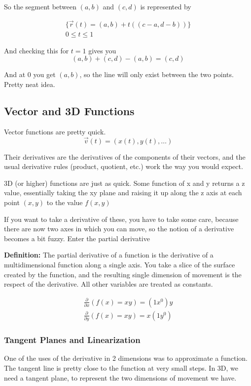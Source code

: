 \documentclass[12pt, letterpaper]{article}
\begin{document}
So the segment between $(a, b)$ and $(c, d)$ is represented by

\begin{gather*}
    \{\vec{r}(t) = (a,b) + t\left((c - a, d - b)\right)\}\\
    0 \leq t \leq 1
\end{gather*}

And checking this for $t = 1$ gives you 
\begin{displaymath}
    (a, b) + (c, d) - (a, b) = (c, d)
\end{displaymath}

And at 0 you get $(a, b)$, so the line will only exist between the two points. Pretty neat idea.

\subsection{Vector and 3D Functions}

Vector functions are pretty quick.
\begin{displaymath}
    \vec{v}(t) = (x(t), y(t), \dots)
\end{displaymath}

Their derivatives are the derivatives of the components of their vectors, and the usual derivative rules (product, quotient, etc.) work the way you would expect.

3D (or higher) functions are just as quick. Some function of x and y returns a z value, essentially taking the xy plane and raising it up along the z axis at each point $(x, y)$ to the value $f(x, y)$

If you want to take a derivative of these, you have to take some care, because there are now two axes in which you can move, so the notion of a derivative becomes a bit fuzzy. Enter the partial derivative

\textbf{Definition:} The partial derivative of a function is the derivative of a multidimensional function along a single axis. You take a slice of the surface created by the function, and the resulting single dimension of movement is the respect of the derivative. All other variables are treated as constants.

\begin{gather*}
    \frac{\partial}{\partial x}(f(x) = xy) = (1x^0)y \\
    \frac{\partial}{\partial y}(f(x) = xy) = x(1y^0)
\end{gather*}

\subsubsection{Tangent Planes and Linearization}
One of the uses of the derivative in 2 dimensions was to approximate a function. The tangent line is pretty close to the function at very small steps. In 3D, we need a tangent plane, to represent the two dimensions of movement we have.
\end{document}
